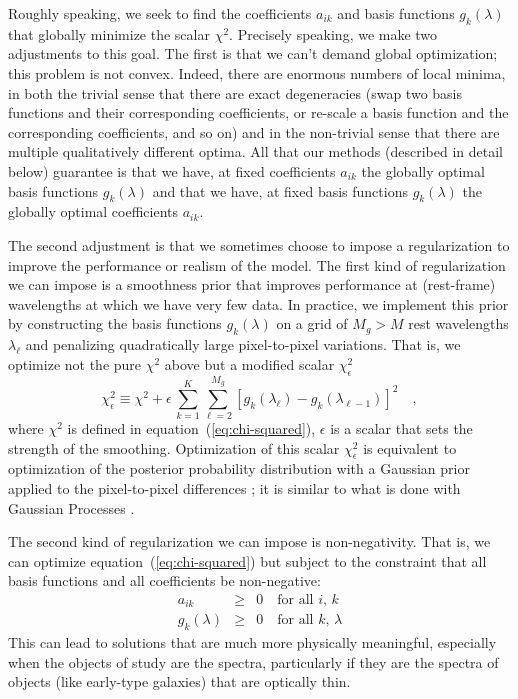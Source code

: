 \documentclass[12pt,preprint]{aastex}
\newcommand{\equationname}{equation}
\begin{document}
Roughly speaking, we seek to find the coefficients $a_{ik}$ and basis
functions $g_k(\lambda)$ that globally minimize the scalar $\chi^2$.
Precisely speaking, we make two adjustments to this goal. The first is
that we can't demand global optimization; this problem is not convex.
Indeed, there are enormous numbers of local minima, in both the
trivial sense that there are exact degeneracies (swap two basis
functions and their corresponding coefficients, or re-scale a basis
function and the corresponding coefficients, and so on) and in the
non-trivial sense that there are multiple qualitatively different
optima. All that our methods (described in detail below) guarantee is
that we have, at fixed coefficients $a_{ik}$ the globally optimal
basis functions $g_k(\lambda)$ and that we have, at fixed basis
functions $g_k(\lambda)$ the globally optimal coefficients $a_{ik}$.

The second adjustment is that we sometimes choose to impose a
regularization to improve the performance or realism of the model.
The first kind of regularization we can impose is a smoothness prior
that improves performance at (rest-frame) wavelengths at which we have
very few data. In practice, we implement this prior by constructing
the basis functions $g_k(\lambda)$ on a grid of $M_g>M$ rest
wavelengths $\lambda_{\ell}$ and penalizing quadratically large
pixel-to-pixel variations. That is, we optimize not the pure $\chi^2$
above but a modified scalar $\chi_{\epsilon}^2$
\begin{equation}\label{eq:smoothness}
\chi_{\epsilon}^2 \equiv \chi^2
 + \epsilon\,\sum_{k=1}^K \sum_{\ell=2}^{M_g}
 \left[g_k(\lambda_{\ell})-g_k(\lambda_{\ell-1})\right]^2
\quad ,
\end{equation}
where $\chi^2$ is defined in \equationname~(\ref{eq:chi-squared}),
$\epsilon$ is a scalar that sets the strength of the
smoothing. Optimization of this scalar $\chi_{\epsilon}^2$ is
equivalent to optimization of the posterior probability distribution
with a Gaussian prior applied to the pixel-to-pixel differences
\citep[for example, ][]{smoothness}; it is similar to what is done
with Gaussian Processes \citep[for example, ][]{Rasmussen06a}.

The second kind of regularization we can impose is non-negativity.
That is, we can optimize \equationname~(\ref{eq:chi-squared}) but subject
to the constraint that all basis functions and all coefficients be
non-negative:
\begin{eqnarray}\label{eq:non-negativity}\displaystyle
a_{ik} & \geq & 0 \quad\mbox{for all $i$, $k$} \nonumber\\
g_{k}(\lambda) & \geq & 0 \quad\mbox{for all $k$, $\lambda$}
\end{eqnarray}
This can lead to solutions that are much more physically meaningful,
especially when the objects of study are the spectra, particularly if
they are the spectra of objects (like early-type galaxies) that are
optically thin.
\end{document}
